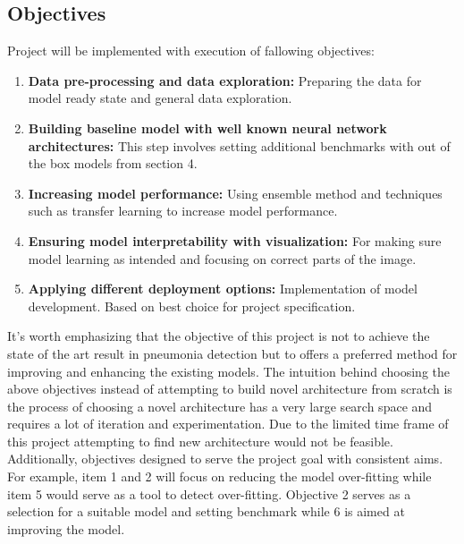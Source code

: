 \subsection{Objectives}
Project will be implemented with execution of fallowing objectives:
\begin{enumerate}
    \item \textbf{Data pre-processing and data exploration: }Preparing the data for model ready state and general data exploration.
    \item \textbf{Building baseline model with well known neural network architectures: }This step involves setting additional benchmarks with out of the box models from section 4.
    \item \textbf{Increasing model performance: }Using ensemble method and techniques such as transfer learning to increase model performance.
    \item \textbf{Ensuring model interpretability with visualization: } For making sure model learning as intended and focusing on correct parts of the image.
    \item \textbf{Applying different deployment options: } Implementation of model development. Based on best choice for project specification.
\end{enumerate}
It's worth emphasizing that the objective of this project is not to achieve the state of the art result in pneumonia detection but to offers a preferred method for improving and enhancing the existing models.
The intuition behind choosing the above objectives instead of attempting to build novel architecture from scratch is the process of choosing a novel architecture has a very large search space and requires a lot of iteration and experimentation. Due to the limited time frame of this project attempting to find new architecture would not be feasible. Additionally, objectives designed to serve the project goal with consistent aims. For example, item 1 and 2 will focus on reducing the model over-fitting while item 5 would serve as a tool to detect over-fitting. Objective 2 serves as a selection for a suitable model and setting benchmark while 6 is aimed at improving the model.

